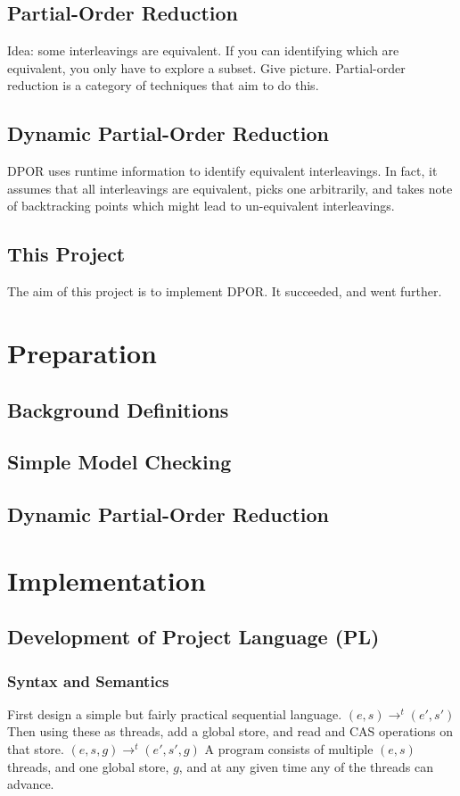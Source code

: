 \documentclass[12pt,a4paper,twoside,openright]{report}
\begin{document}
\section{Partial-Order Reduction}
Idea: some interleavings are equivalent. If you
can identifying which are equivalent, you only
have to explore a subset. Give picture.
Partial-order reduction is a category of techniques
that aim to do this.

\section{Dynamic Partial-Order Reduction}
DPOR uses runtime information to identify
equivalent interleavings. In fact, it assumes
that all interleavings are equivalent, picks
one arbitrarily, and takes note of backtracking
points which might lead to un-equivalent
interleavings.

\section{This Project}
The aim of this project is to implement DPOR.
It succeeded, and went further.

\chapter{Preparation}

\section{Background Definitions}


\section{Simple Model Checking}

\section{Dynamic Partial-Order Reduction}


\chapter{Implementation}

\section{Development of Project Language (PL)}
\subsection{Syntax and Semantics}
First design a simple but fairly practical sequential language.
$(e, s) \longrightarrow^t (e', s')$
Then using these as threads, add a global store, and read and CAS
operations on that store.
$(e, s, g) \longrightarrow^t (e', s', g)$
A program consists of multiple $(e, s)$ threads, and one global store,
$g$, and at any given time any of the threads can advance.
\end{document}

